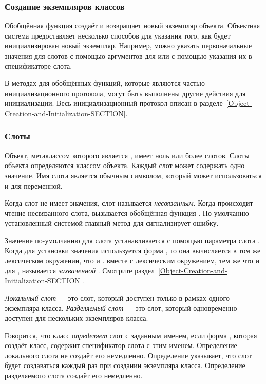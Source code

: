 \subsubsection{Создание экземпляров классов}

Обобщённая функция  создаёт и возвращает новый экземпляр
объекта. Объектная система предоставляет несколько способов для указания того,
как будет инициализирован новый экземпляр. Например, можно указать
первоначальные значения для слотов с помощью аргументов для 
или с помощью указания их в спецификаторе слота.

В методах для обобщённых
функций, которые являются частью инициализационного протокола, могут быть
выполнены другие действия для инициализации. Весь
инициализационный протокол описан в
разделе~\ref{Object-Creation-and-Initialization-SECTION}.

\subsubsection{Слоты}

Объект, метаклассом которого является , имеет ноль или более
слотов.
Слоты объекта определяются классом объекта. Каждый слот может содержать одно
значение. Имя слота является обычным символом, который может использоваться и
для переменной.

Когда слот не имеет значения, слот называется \emph{несвязанным}. Когда
происходит чтение несвязанного слота, вызывается обобщённая функция
. По-умолчанию установленный системой главный метод для
 сигнализирует ошибку.

Значение по-умолчанию для слота устанавливается с помощью параметра слота
. Когда для установки значения используется форма ,
то она вычисляется в том же лексическом окружении, что и
.  вместе с лексическим окружением, тем же что и
для , называется \emph{захваченной} .
Смотрите раздел~\ref{Object-Creation-and-Initialization-SECTION}.

\emph{Локальный слот} --- это слот, который доступен только в рамках одного
экземпляра класса. \emph{Разделяемый слот} --- это слот, который одновременно
доступен для нескольких экземпляров класса.

Говорится, что класс \emph{определяет} слот с заданным именем, если форма
, которая создаёт класс, содержит спецификатор слота с этим
именем.
Определение локального слота не создаёт его немедленно. Определение указывает,
что слот будет создаваться каждый раз при создании экземпляра
класса. Определение разделяемого слота создаёт его немедленно.

